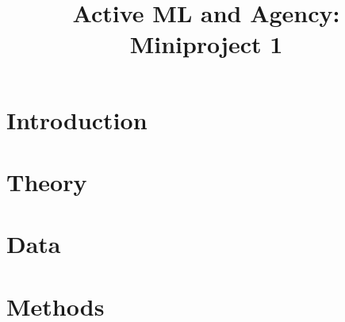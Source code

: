 \documentclass[10pt,oneside,a4paper,english]{article}
\title{Active ML and Agency: Miniproject 1} %
\begin{document}


\newpage
{} 

\section*{Introduction} \label{ch1}


\section*{Theory} \label{ch2}


\section*{Data} \label{ch3}

\section*{Methods} \label{ch4}

\label{EndOfText}

\newpage
{} 
% 
\label{endOfDoc}
\end{document}
